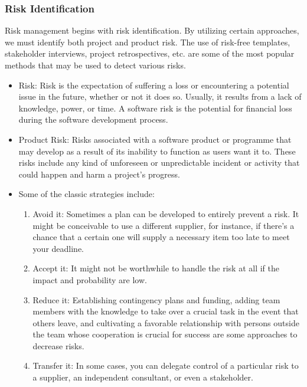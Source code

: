 \documentclass[oneside, 12pt]{book}
\begin{document}
			\subsubsection{Risk Identification}
				Risk management begins with risk identification. By utilizing certain approaches, we must identify both project and product risk. The use of risk-free templates, stakeholder interviews, project retrospectives, etc. are some of the most popular methods that may be used to detect various risks.
				\begin{itemize}
					\item Risk: Risk is the expectation of suffering a loss or encountering a potential issue in the future, whether or not it does so. Usually, it results from a lack of knowledge, power, or time. A software risk is the potential for financial loss during the software development process.
					\item Product Risk: Risks associated with a software product or programme that may develop as a result of its inability to function as users want it to. These risks include any kind of unforeseen or unpredictable incident or activity that could happen and harm a project's progress. 
					\item Some of the classic strategies include:
					\begin{enumerate}
						\item Avoid it: Sometimes a plan can be developed to entirely prevent a risk. It might be conceivable to use a different supplier, for instance, if there's a chance that a certain one will supply a necessary item too late to meet your deadline.
						\item Accept it: It might not be worthwhile to handle the risk at all if the impact and probability are low. 
						\item Reduce it: Establishing contingency plans and funding, adding team members with the knowledge to take over a crucial task in the event that others leave, and cultivating a favorable relationship with persons outside the team whose cooperation is crucial for success are some approaches to decrease risks.
						\item Transfer it: In some cases, you can delegate control of a particular risk to a supplier, an independent consultant, or even a stakeholder.
					\end{enumerate}
				\end{itemize}
\end{document}
